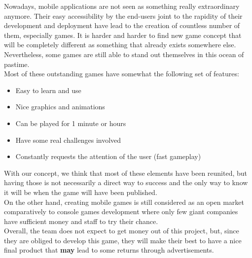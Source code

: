 Nowadays, mobile applications are not seen as something really extraordinary anymore. Their easy accessibility by the end-users joint to the rapidity of their development and deployment have lead to the creation of countless number of them, especially games. It is harder and harder to find new game concept that will be completely different as something that already exists somewhere else. Nevertheless, some games are still able to stand out themselves in this ocean of pastime. \\

Most of these outstanding games have somewhat the following set of features:
\begin{itemize}
  \item Easy to learn and use
  \item Nice graphics and animations
  \item Can be played for 1 minute or hours
  \item Have some real challenges involved
  \item Constantly requests the attention of the user (fast gameplay)
\end{itemize}

With our concept, we think that most of these elements have been reunited, but having those is not necessarily a direct way to success and the only way to know it will be when the game will have been published. \\

On the other hand, creating mobile games is still considered as an open market comparatively to console games development where only few giant companies have sufficient money and staff to try their chance. \\

Overall, the team does not expect to get money out of this project, but, since they are obliged to develop this game, they will make their best to have a nice final product that \textbf{may} lead to some returns through advertisements. 
